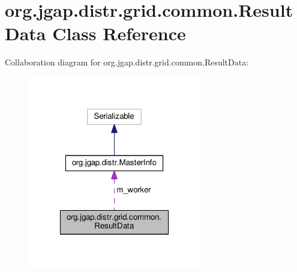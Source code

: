 \hypertarget{classorg_1_1jgap_1_1distr_1_1grid_1_1common_1_1_result_data}{\section{org.\-jgap.\-distr.\-grid.\-common.\-Result\-Data Class Reference}
\label{classorg_1_1jgap_1_1distr_1_1grid_1_1common_1_1_result_data}
}


Collaboration diagram for org.\-jgap.\-distr.\-grid.\-common.\-Result\-Data\-:
\nopagebreak
\begin{figure}[H]
\begin{center}
\leavevmode
\includegraphics[width=214pt]{classorg_1_1jgap_1_1distr_1_1grid_1_1common_1_1_result_data__coll__graph}
\end{center}
\end{figure}
